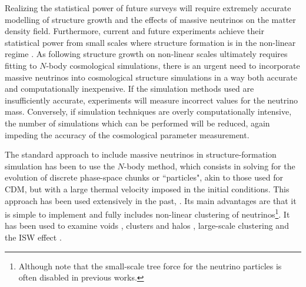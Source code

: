 \documentclass[useAMS, usenatbib]{mnras}
\begin{document}
Realizing the statistical power of future surveys will require extremely accurate modelling of structure growth and the effects of massive neutrinos on the matter density field.
Furthermore, current and future experiments achieve their statistical power from small scales where structure formation is in the non-linear regime \citep[e.g.~][]{Troxel_2017, HSC_2017}.
As following structure growth on non-linear scales ultimately requires fitting to $N$-body cosmological simulations, there is an urgent need to incorporate massive neutrinos into cosmological structure simulations
in a way both accurate and computationally inexpensive.
If the simulation methods used are insufficiently accurate, experiments will measure incorrect values for the neutrino mass.
Conversely, if simulation techniques are overly computationally intensive, the number of simulations which can be performed will be reduced, again impeding the accuracy of the cosmological parameter measurement.

The standard approach to include massive neutrinos in structure-formation simulation has been to use the $N$-body method, which consists in solving for the evolution of discrete phase-space chunks or ``particles", akin to those used for CDM, but with a %
large thermal velocity imposed in the initial conditions. This approach has been used extensively in the past, \cite[e.g.~][]{Brandbyge_2008, Bird_2012, Inman_2017, FVN_2017}. Its main advantages are that it is simple to implement and fully includes non-linear clustering of neutrinos\footnote{Although note that the small-scale tree force for the neutrino particles is often disabled in previous works.}. It has been used to examine voids \citep{Massara_2015}, clusters and halos \citep{FVN_2014, Castorina_2014, Costanzi_2013}, large-scale clustering \citep{Castorina_2015} and the ISW effect \citep{Carbone_2016}.
\end{document}
